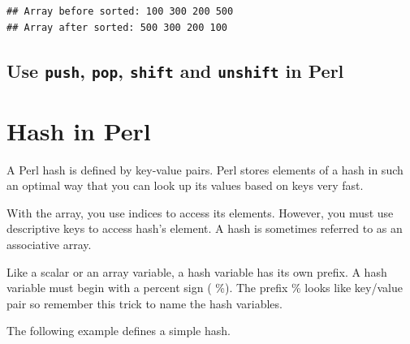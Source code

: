 \documentclass[]{book}
\makeatletter
\newenvironment{Shaded}{\begin{snugshade}}{\end{snugshade}}
\newcommand{\CharTok}[1]{\textcolor[rgb]{0.31,0.60,0.02}{#1}}
\newcommand{\DataTypeTok}[1]{\textcolor[rgb]{0.13,0.29,0.53}{#1}}
\newcommand{\FunctionTok}[1]{\textcolor[rgb]{0.00,0.00,0.00}{#1}}
\newcommand{\KeywordTok}[1]{\textcolor[rgb]{0.13,0.29,0.53}{\textbf{#1}}}
\newcommand{\NormalTok}[1]{#1}
\newcommand{\StringTok}[1]{\textcolor[rgb]{0.31,0.60,0.02}{#1}}
\newenvironment{kframe}{%
\medskip{}
\setlength{\fboxsep}{.8em}
 \def\at@end@of@kframe{}%
 \ifinner\ifhmode%
  \def\at@end@of@kframe{\end{minipage}}%
  \begin{minipage}{\columnwidth}%
 \fi\fi%
 \def\FrameCommand##1{\hskip\@totalleftmargin \hskip-\fboxsep
 \colorbox{shadecolor}{##1}\hskip-\fboxsep
     \hskip-\linewidth \hskip-\@totalleftmargin \hskip\columnwidth}%
 \MakeFramed {\advance\hsize-\width
   \@totalleftmargin\z@ \linewidth\hsize
   \@setminipage}}%
 {\par\unskip\endMakeFramed%
 \at@end@of@kframe}
\renewenvironment{Shaded}{\begin{kframe}}{\end{kframe}}
\makeatother
\begin{document}
\begin{verbatim}
## Array before sorted: 100 300 200 500
## Array after sorted: 500 300 200 100
\end{verbatim}

\hypertarget{use-push-pop-shift-and-unshift-in-perl}{%
\subsection{\texorpdfstring{Use \texttt{push}, \texttt{pop}, \texttt{shift} and \texttt{unshift} in Perl}{Use push, pop, shift and unshift in Perl}}\label{use-push-pop-shift-and-unshift-in-perl}}

\hypertarget{hash-in-perl}{%
\section{Hash in Perl}\label{hash-in-perl}}

A Perl hash is defined by key-value pairs. Perl stores elements of a hash in such an optimal way that you can look up its values based on keys very fast.

With the array, you use indices to access its elements. However, you must use descriptive keys to access hash's element. A hash is sometimes referred to as an associative array.

Like a scalar or an array variable, a hash variable has its own prefix. A hash variable must begin with a percent sign ( \%). The prefix \% looks like key/value pair so remember this trick to name the hash variables.

The following example defines a simple hash.

\begin{Shaded}
\end{Shaded}
\end{document}
